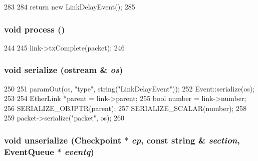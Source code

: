 \begin{DoxyCode}
283 {
284     return new LinkDelayEvent();
285 }
\end{DoxyCode}
\hypertarget{classLinkDelayEvent_a2e9c5136d19b1a95fc427e0852deab5c}{
\subsubsection[{process}]{\setlength{\rightskip}{0pt plus 5cm}void process ()}}
\label{classLinkDelayEvent_a2e9c5136d19b1a95fc427e0852deab5c}



\begin{DoxyCode}
244 {
245     link->txComplete(packet);
246 }
\end{DoxyCode}
\hypertarget{classLinkDelayEvent_a21e39b74fa4d4676016935883b644bc4}{
\subsubsection[{serialize}]{\setlength{\rightskip}{0pt plus 5cm}void serialize (ostream \& {\em os})}}
\label{classLinkDelayEvent_a21e39b74fa4d4676016935883b644bc4}



\begin{DoxyCode}
250 {
251     paramOut(os, "type", string("LinkDelayEvent"));
252     Event::serialize(os);
253 
254     EtherLink *parent = link->parent;
255     bool number = link->number;
256     SERIALIZE_OBJPTR(parent);
257     SERIALIZE_SCALAR(number);
258 
259     packet->serialize("packet", os);
260 }
\end{DoxyCode}
\hypertarget{classLinkDelayEvent_aa47cff31a391937b0975fee5a5e53eba}{
\subsubsection[{unserialize}]{\setlength{\rightskip}{0pt plus 5cm}void unserialize ({\bf Checkpoint} $\ast$ {\em cp}, \/  const string \& {\em section}, \/  {\bf EventQueue} $\ast$ {\em eventq})}}
\label{classLinkDelayEvent_aa47cff31a391937b0975fee5a5e53eba}



